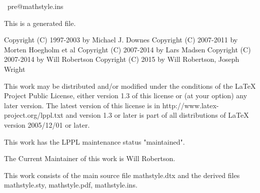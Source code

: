 \ pre@mathstyle.ins 

\Msg{************************************************************************}
\Msg{************************************************************************}

\keepsilent
\askforoverwritefalse

\preamble

This is a generated file.

Copyright (C) 1997-2003 by Michael J. Downes
Copyright (C) 2007-2011 by Morten Hoegholm et al
Copyright (C) 2007-2014 by Lars Madsen
Copyright (C) 2007-2014 by Will Robertson
Copyright (C) 2015 by Will Robertson, Joseph Wright

This work may be distributed and/or modified under the
conditions of the LaTeX Project Public License, either
version 1.3 of this license or (at your option) any later
version. The latest version of this license is in
   http://www.latex-project.org/lppl.txt
and version 1.3 or later is part of all distributions of
LaTeX version 2005/12/01 or later.

This work has the LPPL maintenance status "maintained".

The Current Maintainer of this work is Will Robertson.

This work consists of the main source file mathstyle.dtx
and the derived files
   mathstyle.sty, mathstyle.pdf, mathstyle.ins.

\endpreamble


\obeyspaces
\Msg{************************************************************************}
\Msg{*}
\Msg{*}
\Msg{*}
\Msg{*}
\Msg{************************************************************************}

